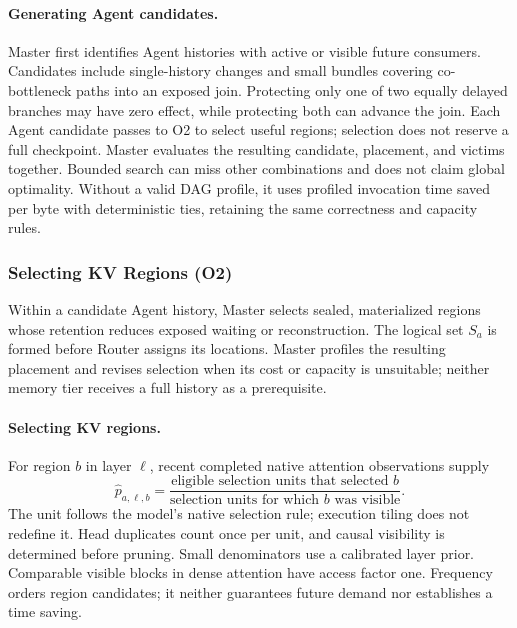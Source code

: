 \paragraph{Generating Agent candidates.}
Master first identifies Agent histories with active or visible future
consumers. Candidates include single-history changes and small bundles
covering co-bottleneck paths into an exposed join. Protecting only one
of two equally delayed branches may have zero effect, while protecting
both can advance the join. Each Agent candidate passes to O2 to
select useful regions; selection does not reserve a full checkpoint.
Master evaluates the resulting candidate, placement, and victims
together. Bounded search can miss other combinations and does not claim
global optimality. Without a valid DAG profile, it uses profiled
invocation time saved per byte with deterministic ties, retaining the
same correctness and capacity rules.

\subsubsection{Selecting KV Regions (O2)}
\label{sec:teacher-region-selection}

Within a candidate Agent history, Master selects sealed, materialized
regions whose retention reduces exposed waiting or reconstruction.
The logical set $S_a$ is formed before Router assigns its locations.
Master profiles the resulting placement and revises selection when its
cost or capacity is unsuitable; neither memory tier receives a full
history as a prerequisite.

\paragraph{Selecting KV regions.}
For region $b$ in layer $\ell$, recent completed native attention
observations supply
\begin{equation}
 \widehat p_{a,\ell,b}=
 \frac{\text{eligible selection units that selected }b}
      {\text{selection units for which }b\text{ was visible}}.
 \label{eq:teacher-demand}
\end{equation}
The unit follows the model's native selection rule; execution tiling
does not redefine it. Head duplicates count once per unit, and causal
visibility is determined before pruning. Small denominators use a
calibrated layer prior. Comparable visible blocks in dense attention
have access factor one. Frequency orders region candidates; it neither
guarantees future demand nor establishes a time saving.

